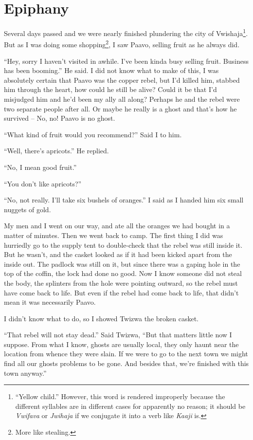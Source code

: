 \chapter{Epiphany}

Several days passed and we were nearly finished plundering the city of Vwishaja\footnote{``Yellow child.'' However, this word is rendered improperly because the different syllables are in different cases for apparently no reason; it should be \emph{Vwifava} or \emph{Jwihaja} if we conjugate it into a verb like \emph{Kaaji} is.}. But as I was doing some shopping\footnote{More like stealing.}, I saw Paavo, selling fruit as he always did.

``Hey, sorry I haven't visited in awhile. I've been kinda busy selling fruit. Business has been booming.'' He said. I did not know what to make of this, I was absolutely certain that Paavo was the copper rebel, but I'd killed him, stabbed him through the heart, how could he still be alive? Could it be that I'd misjudged him and he'd been my ally all along? Perhaps he and the rebel were two separate people after all. Or maybe he really is a ghost and that's how he survived -- No, no! Paavo is no ghost.

``What kind of fruit would you recommend?'' Said I to him.

``Well, there's apricots.'' He replied.

``No, I mean good fruit.''

``You don't like apricots?''

``No, not really. I'll take six bushels of oranges.'' I said as I handed him six small nuggets of gold.

My men and I went on our way, and ate all the oranges we had bought in a matter of minutes. Then we went back to camp. The first thing I did was hurriedly go to the supply tent to double-check that the rebel was still inside it. But he wasn't, and the casket looked as if it had been kicked apart from the inside out. The padlock was still on it, but since there was a gaping hole in the top of the coffin, the lock had done no good. Now I know someone did not steal the body, the splinters from the hole were pointing outward, so the rebel must have come back to life. But even if the rebel had come back to life, that didn't mean it was necessarily Paavo.

I didn't know what to do, so I showed Twizwa the broken casket.

``That rebel will not stay dead.'' Said Twizwa, ``But that matters little now I suppose. From what I know, ghosts are usually local, they only haunt near the location from whence they were slain. If we were to go to the next town we might find all our ghosts problems to be gone. And besides that, we're finished with this town anyway.''

